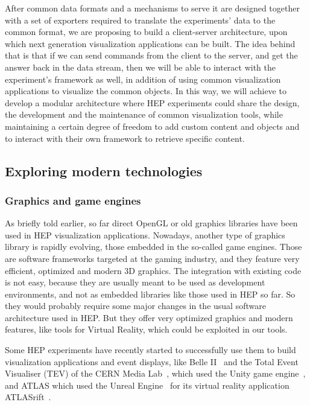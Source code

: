 \documentclass[12pt,a4paper]{article}
\begin{document}
After common data formats and a mechanisms to serve it are designed together with a set of exporters required to translate the
experiments’ data to the common format, we are proposing to build a client-server architecture, upon which next generation visualization applications can be built.
The idea behind that is that if we can send commands from the client to the server, and get the answer back in the data stream,
then we will be able to interact with the experiment’s framework as well, in addition of using common visualization applications
to visualize the common objects. In this way, we will achieve to develop a modular architecture where HEP experiments could share
the design, the development and the maintenance of common visualization tools, while maintaining a certain degree of freedom to
add custom content and objects and to interact with their own framework to retrieve specific content.

\hypertarget{modern-tech}{%
\subsection{Exploring modern technologies}\label{modern-tech}}

\hypertarget{graphic-engines}{%
\subsubsection{Graphics and game engines}\label{graphic-engines}}

As briefly told earlier, so far direct OpenGL or old graphics libraries have been used in HEP visualization applications. Nowadays,
another type of graphics library is rapidly evolving, those embedded in the so-called game engines. Those are software frameworks
targeted at the gaming industry, and they feature very efficient, optimized and modern 3D graphics.
The integration with existing code is not easy, because they are usually meant to be used as development environments, and not as
embedded libraries like those used in HEP so far. So they would probably require some major changes in the usual software architecture
used in HEP. But they offer very optimized graphics and modern features, like tools for Virtual Reality, which could be exploited in our tools.

Some HEP experiments have recently started to successfully use them to build visualization applications and event displays,
like Belle II~\cite{BelleIIVR} and the Total Event Visualiser (TEV) of the CERN Media Lab~\cite{CERNTEV}, which used the Unity
game engine~\cite{Unity3D}, and ATLAS which used the Unreal Engine~\cite{EpicUnreal} for its virtual reality application
ATLASrift~\cite{ATLASRift}.
\end{document}
